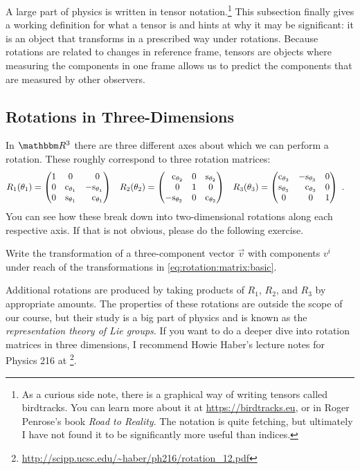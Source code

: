 \documentclass[12pt]{article}
\begin{document}
A large part of physics is written in tensor notation.\footnote{As a curious side note, there is a graphical way of writing tensors called birdtracks. You can learn more about it at \url{https://birdtracks.eu}, or in Roger Penrose's book \emph{Road to Reality}. The notation is quite fetching, but ultimately I have not found it to be significantly more useful than indices.} This subsection finally gives a working definition for what a tensor is and hints at why it may be significant: it is an object that transforms in a prescribed way under rotations. Because rotations are related to changes in reference frame, tensors are objects where measuring the components in one frame allows us to predict the components that are measured by other observers. 

\subsection{Rotations in Three-Dimensions}

In $\RR ^3$ there are three different axes about which we can perform a rotation. These roughly correspond to three rotation matrices:
\begin{align}
    R_1(\theta_1)
    &=
    \begin{pmatrix}
        1 & 0 & \pp 0 \\
        0 & \text{c}_{\theta_1} & -\text{s}_{\theta_1} \\
        0 & \text{s}_{\theta_1} & \pp \text{c}_{\theta_1}
    \end{pmatrix}
    &
    R_2(\theta_2)
    &=
    \begin{pmatrix}
        \pp \text{c}_{\theta_2} & 0 & \text{s}_{\theta_2} \\
        \pp 0 & 1 & 0 \\
        -\text{s}_{\theta_2} & 0 & \text{c}_{\theta_2}
    \end{pmatrix}
    &
    R_3(\theta_3)
    &=
    \begin{pmatrix}
        \text{c}_{\theta_3} & -\text{s}_{\theta_3} & 0 \\
        \text{s}_{\theta_3} & \pp\text{c}_{\theta_3} & 0 \\
        0 & \pp 0 & 1
    \end{pmatrix} \ .
    \label{eq:rotation:matrix:basic}
\end{align}
You can see how these break down into two-dimensional rotations along each respective axis. If that is not obvious, please do the following exercise.
\begin{exercise}
Write the transformation of a three-component vector $\vec{v}$ with components $v^i$ under reach of the transformations in \eqref{eq:rotation:matrix:basic}. 
\end{exercise}
Additional rotations are produced by taking products of $R_1$, $R_2$, and $R_3$ by appropriate amounts. The properties of these rotations are outside the scope of our course, but their study is a big part of physics and is known as the \emph{representation theory of Lie groups}. If you want to do a deeper dive into rotation matrices in three dimensions, I recommend Howie Haber's lecture notes for Physics 216 at \footnote{\url{http://scipp.ucsc.edu/~haber/ph216/rotation_12.pdf}}. 
\end{document}
